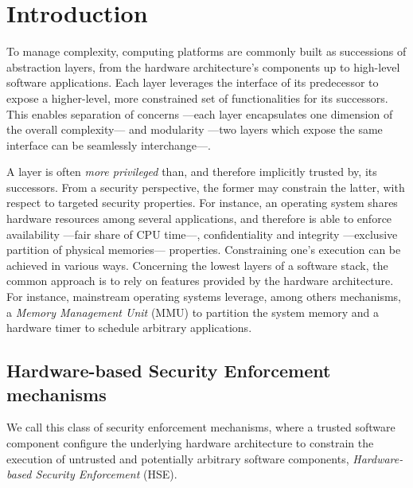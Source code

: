 \chapter{Introduction}


\vspace{1cm}\noindent To manage complexity, computing platforms are commonly
built as successions of abstraction layers, from the hardware architecture's
components up to high-level software applications.
%
Each layer leverages the interface of its predecessor to expose a higher-level,
more constrained set of functionalities for its successors.
%
This enables separation of concerns ---each layer encapsulates one dimension of
the overall complexity--- and modularity ---two layers which expose the same
interface can be seamlessly interchange---.

A layer is often \emph{more privileged} than, and therefore implicitly trusted
by, its successors.
%
From a security perspective, the former may constrain the latter, with respect
to targeted security properties.
%
For instance, an operating system shares hardware resources among several
applications, and therefore is able to enforce availability ---fair share of CPU
time---, confidentiality and integrity ---exclusive partition of physical
memories--- properties.
%
Constraining one's execution can be achieved in various ways.
%
Concerning the lowest layers of a software stack, the common approach is to rely
on features provided by the hardware architecture.
%
For instance, mainstream operating systems leverage, among others mechanisms, a
\emph{Memory Management Unit} (MMU) to partition the system memory and a
hardware timer to schedule arbitrary applications.

\section{Hardware-based Security Enforcement mechanisms}

We call this class of security enforcement mechanisms, where a trusted software
component configure the underlying hardware architecture to constrain the
execution of untrusted and potentially arbitrary software components,
\emph{Hardware-based Security Enforcement} (HSE).

